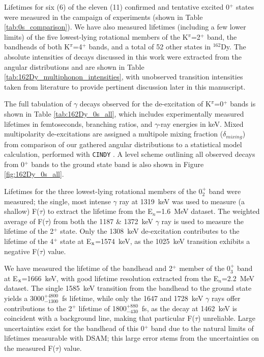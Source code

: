 Lifetimes for six (6) of the eleven (11) confirmed and tentative excited 0$^+$ states \cite{Meyer_pt0_2006} were measured in the campaign of experiments (shown in Table \ref{tab:0s_comparison}). We have also measured lifetimes (including a few lower limits) of the five lowest-lying rotational members of the K$^\pi$=2$^+$ band, the bandheads of both K$^\pi$=4$^+$ bands, and a total of 52 other states in $^{162}$Dy. The absolute intensities of decays discussed in this work were extracted from the angular distributions and are shown in Table \ref{tab:162Dy_multiphonon_intensities}, with unobserved transition intensities taken from literature \cite{Aprahamian200642,Zamfir_162Dy0_1999,Wu_2minus_2001} to provide pertinent discussion later in this manuscript.


The full tabulation of $\gamma$ decays observed for the de-excitation of K$^\pi$=0$^+$ bands is shown in Table \ref{tab:162Dy_0s_all}, which includes experimentally measured lifetimes in femtoseconds, branching ratios, and $\gamma$-ray energies in keV. Mixed multipolarity de-excitations are assigned a multipole mixing fraction ($\delta_{mixing}$) from comparison of our gathered angular distributions to a statistical model calculation, performed with {\tt CINDY} \cite{SHELDON197399}. A level scheme outlining all observed decays from 0$^+$ bands to the ground state band is also shown in Figure \ref{fig:162Dy_0s_all}.

Lifetimes for the three lowest-lying rotational members of the 0$^+_2$ band were measured; the single, most intense $\gamma$ ray at 1319~keV was used to measure (a shallow) F($\tau$) to extract the lifetime from the E$_n$=1.6~MeV dataset. The weighted average of F($\tau$) from both the 1187 \& 1372~keV $\gamma$ ray is used to measure the lifetime of the 2$^+$ state. Only the 1308~keV de-excitation contributes to the lifetime of the 4$^+$ state at E$_{\rm x}$=1574~keV, as the 1025~keV transition exhibits a negative F($\tau$) value.

We have measured the lifetime of the bandhead and 2$^+$ member of the 0$^+_3$ band at E$_{\rm x}$=1666~keV, with good lifetime resolution extracted from the E$_n$=2.2~MeV dataset. The single 1585~keV transition from the bandhead to the ground state yields a 3000$^{+4800}_{-1300}$~fs lifetime, while only the 1647 and 1728~keV $\gamma$ rays offer contributions to the 2$^+$ lifetime of 1800$^{+880}_{-430}$~fs, as the decay at 1462~keV is coincident with a background line, making that particular F($\tau$) unreliable. Large uncertainties exist for the bandhead of this 0$^+$ band due to the natural limits of lifetimes measurable with DSAM; this large error stems from the uncertainties on the measured F($\tau$) value.

